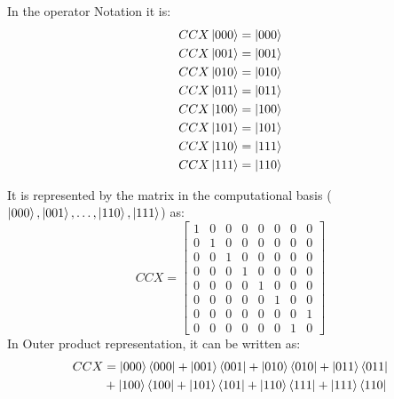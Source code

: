 In the operator Notation it is:
\begin{align*}
    CCX\ket{000}&=\ket{000} \\
    CCX\ket{001}&=\ket{001} \\
    CCX\ket{010}&=\ket{010} \\
    CCX\ket{011}&=\ket{011} \\
    CCX\ket{100}&=\ket{100} \\
    CCX\ket{101}&=\ket{101} \\
    CCX\ket{110}&=\ket{111} \\
    CCX\ket{111}&=\ket{110}
\end{align*}

It is represented by the matrix in the computational basis 
($\ket{000},\ket{001},\ldots,\ket{110},\ket{111}$) as:
\[
    CCX=\begin{bmatrix}
        1 & 0 & 0 & 0 & 0 & 0 & 0 & 0 \\
        0 & 1 & 0 & 0 & 0 & 0 & 0 & 0 \\
        0 & 0 & 1 & 0 & 0 & 0 & 0 & 0 \\
        0 & 0 & 0 & 1 & 0 & 0 & 0 & 0 \\
        0 & 0 & 0 & 0 & 1 & 0 & 0 & 0 \\
        0 & 0 & 0 & 0 & 0 & 1 & 0 & 0 \\
        0 & 0 & 0 & 0 & 0 & 0 & 0 & 1 \\
        0 & 0 & 0 & 0 & 0 & 0 & 1 & 0
    \end{bmatrix}
\]
In Outer product representation, it can be written as:
\begin{align*}
    CCX&=\ket{000}\bra{000}+\ket{001}\bra{001}+\ket{010}\bra{010}+\ket{011}\bra{011} \\
    &+\ket{100}\bra{100}+\ket{101}\bra{101}+\ket{110}\bra{111}+\ket{111}\bra{110}
\end{align*}

